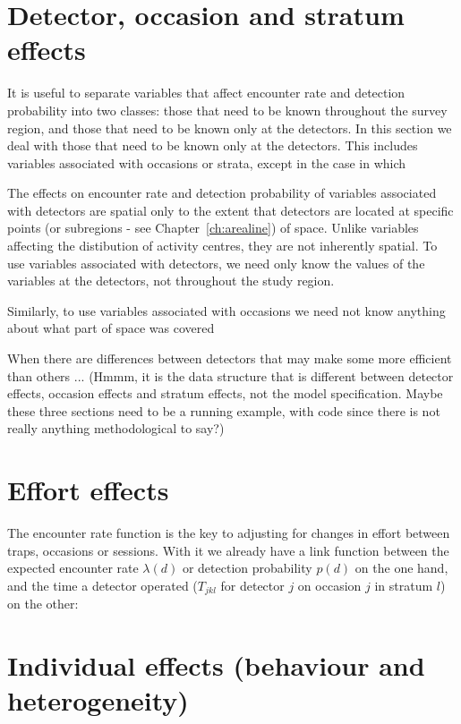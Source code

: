 \documentclass[graybox,envcountchap,sectrefs]{SpringerStyleFiles/styles/svmono}\usepackage[]{graphicx}\usepackage[]{color}
\begin{document}
\section{Detector, occasion and stratum effects}

It is useful to separate variables that affect encounter rate and detection probability into two classes: those that need to be known throughout the survey region, and those that need to be known only at the detectors. In this section we deal with those that need to be known only at the detectors. This includes variables associated with occasions or strata, except in the case in which 


The effects on encounter rate and detection probability of variables associated with detectors are spatial only to the extent that detectors are located at specific points (or subregions - see Chapter~\ref{ch:arealine}) of space. Unlike variables affecting the distibution of activity centres, they are not inherently spatial. To use variables associated with detectors, we need only know the values of the variables at the detectors, not throughout the study region. 

Similarly, to use variables associated with occasions we need not know anything about what part of space was covered 

When there are differences between detectors that may make some more efficient than others ... (Hmmm, it is the data structure that is different between detector effects, occasion effects and stratum effects, not the model specification. Maybe these three sections need to be a running example, with code since there is not really anything methodological to say?)



\section{Effort effects}

The encounter rate function is the key to adjusting for changes in effort between traps, occasions or sessions. With it we already have a link function between the expected encounter rate $\lambda(d)$ or detection probability $p(d)$ on the one hand, and the time a detector operated ($T_{jkl}$ for detector $j$ on occasion $j$ in stratum $l$) on the other:

\section{Individual effects (behaviour and heterogeneity)}
\end{document}
